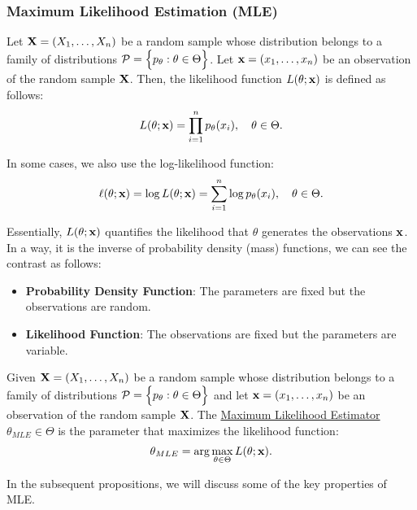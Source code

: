 \subsubsection{Maximum Likelihood Estimation (MLE)}
\begin{definition}
    Let ${\bf X}=(X_1, \dots, X_n)$ be a random sample whose distribution belongs to a family of distributions $\mathcal{P}=\Big\{ p_\theta:\theta\in\Theta \Big\}$. Let ${\bf x}=(x_1, \dots, x_n)$ be an observation of the random sample ${\bf X}$. Then, the likelihood function $L(\theta;{\bf x})$ is defined as follows:
    \begin{equation}
        L(\theta;{\bf x}) = \prod_{i=1}^n p_\theta(x_i), \quad \theta\in\Theta.
    \end{equation}

    \noindent In some cases, we also use the log-likelihood function:
    \begin{equation}
        \ell(\theta;{\bf x}) = \log L(\theta;{\bf x}) = \sum_{i=1}^n \log p_\theta(x_i), \quad \theta\in\Theta.
    \end{equation}

    \noindent Essentially, $L(\theta;{\bf x})$ quantifies the likelihood that $\theta$ generates the observations ${\bf x}$. In a way, it is the inverse of probability density (mass) functions, we can see the contrast as follows:
    \begin{itemize}
        \item \textbf{Probability Density Function}: The parameters are fixed but the observations are random.
        \item \textbf{Likelihood Function}: The observations are fixed but the parameters are variable.
    \end{itemize} 
\end{definition}

\begin{definition}
    Given ${\bf X}=(X_1, \dots, X_n)$ be a random sample whose distribution belongs to a family of distributions $\mathcal{P}=\Big\{ p_\theta:\theta\in\Theta \Big\}$ and let ${\bf x}=(x_1, \dots, x_n)$ be an observation of the random sample ${\bf X}$. The \underline{Maximum Likelihood Estimator} $\theta_{MLE}\in\Theta$ is the parameter that maximizes the likelihood function:
    \begin{equation}
        \theta_{MLE} = \arg\max_{\theta\in\Theta} L(\theta;{\bf x}).
    \end{equation}

    \noindent In the subsequent propositions, we will discuss some of the key properties of MLE.
\end{definition} 


